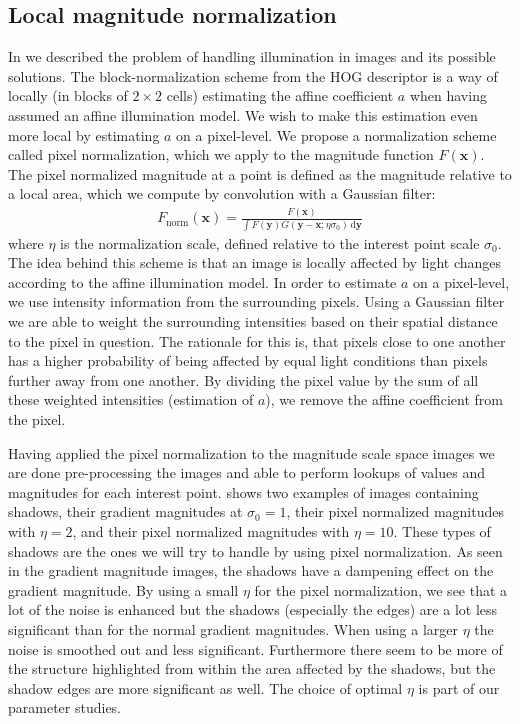 \documentclass[thesis.tex]{subfiles}
\def\x{\mathbf{x}}
\def\y{\mathbf{y}}
\begin{document}
\subsection{Local magnitude normalization}
\label{sec:localMagnitudeNormalization}
%
In  we described the problem of handling illumination in images and its possible solutions. The block-normalization scheme from the HOG descriptor \cite{dalal2005histograms} is a way of locally (in blocks of $2 \times 2$ cells) estimating the affine coefficient $a$ when having assumed an affine illumination model. We wish to make this estimation even more local by estimating $a$ on a pixel-level. We propose a normalization scheme called pixel normalization, which we apply to the magnitude function $F(\x)$.
The pixel normalized magnitude at a point is defined as the magnitude relative to a local area, which we compute by convolution with a Gaussian filter:
%
\begin{align}
F_\text{norm}(\x) = \frac{F(\x)}{\int F(\y) G(\y - \x; \eta \sigma_0) \,\text{d} \y}
\end{align}
%
where $\eta$ is the normalization scale, defined relative to the interest point scale $\sigma_0$. The idea behind this scheme is that an image is locally affected by light changes according to the affine illumination model. In order to estimate $a$ on a pixel-level, we use intensity information from the surrounding pixels. Using a Gaussian filter we are able to weight the surrounding intensities based on their spatial distance to the pixel in question. The rationale for this is, that pixels close to one another has a higher probability of being affected by equal light conditions than pixels further away from one another. By dividing the pixel value by the sum of all these weighted intensities (estimation of $a$), we remove the affine coefficient from the pixel.

Having applied the pixel normalization to the magnitude scale space images we are done pre-processing the images and able to perform lookups of values and magnitudes for each interest point.
 shows two examples of images containing shadows, their gradient magnitudes at $\sigma_0 = 1$, their pixel normalized magnitudes with $\eta = 2$, and their pixel normalized magnitudes with $\eta = 10$. These types of shadows are the ones we will try to handle by using pixel normalization. As seen in the gradient magnitude images, the shadows have a dampening effect on the gradient magnitude. By using a small $\eta$ for the pixel normalization, we see that a lot of the noise is enhanced but the shadows (especially the edges) are a lot less significant than for the normal gradient magnitudes. When using a larger $\eta$ the noise is smoothed out and less significant. Furthermore there seem to be more of the structure highlighted from within the area affected by the shadows, but the shadow edges are more significant as well. The choice of optimal $\eta$ is part of our parameter studies.
\end{document}

